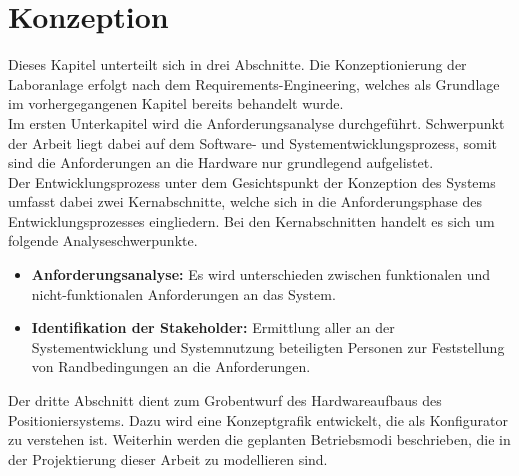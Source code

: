\documentclass[../../Bachelorarbeit.tex]{subfiles}
\begin{document}
\section{Konzeption}
Dieses Kapitel unterteilt sich in drei Abschnitte. Die Konzeptionierung der Laboranlage erfolgt nach dem Requirements-Engineering, welches als Grundlage im vorhergegangenen Kapitel bereits behandelt wurde.\\
Im ersten Unterkapitel wird die Anforderungsanalyse durchgeführt. Schwerpunkt der Arbeit liegt dabei auf dem Software- und Systementwicklungsprozess, somit sind die Anforderungen an die Hardware nur grundlegend aufgelistet.\\
Der Entwicklungsprozess unter dem Gesichtspunkt der Konzeption des Systems umfasst dabei zwei Kernabschnitte, welche sich in die Anforderungsphase des Entwicklungsprozesses eingliedern. Bei den Kernabschnitten handelt es sich um folgende Analyseschwerpunkte.\\
\begin{itemize}
    \item \textbf{Anforderungsanalyse:} Es wird unterschieden zwischen funktionalen und nicht-funktionalen Anforderungen an das System.
    \item \textbf{Identifikation der Stakeholder:} Ermittlung aller an der Systementwicklung und Systemnutzung beteiligten Personen zur Feststellung von Randbedingungen an die Anforderungen.
\end{itemize}

Der dritte Abschnitt dient zum Grobentwurf des Hardwareaufbaus des Positioniersystems. Dazu wird eine Konzeptgrafik entwickelt, die als Konfigurator zu verstehen ist. Weiterhin werden die geplanten Betriebsmodi beschrieben, die in der Projektierung dieser Arbeit zu modellieren sind.
\end{document}
